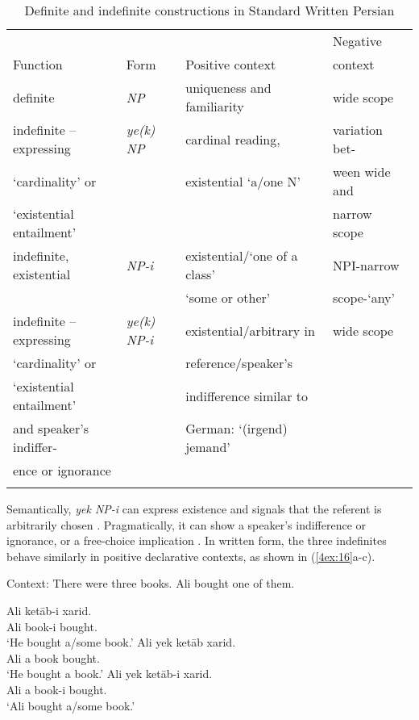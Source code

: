 \documentclass[output=paper]{langsci/langscibook}
\begin{document}
\begin{table}[H]
\centering
{\small{
\begin{tabular}{m{93pt}llm{65pt}}
\lsptoprule
 &  &  & Negative \\
Function & Form & Positive context & context \\
\midrule 
definite & {\emph{NP}} & uniqueness and familiarity & wide scope \\
\hline
indefinite -- expressing  	& {\emph{ye(k) NP}} 		& cardinal reading,  		& variation bet- \\
`cardinality' or  			& 					& existential `a/one N'	& ween wide and \\
`existential entailment'	&					&					& narrow scope \\
\hline
indefinite, existential 		& {\emph{NP-i}}		& existential/`one of a class' 	& NPI-narrow  \\
					&				& `some or other'			& scope-`any'\\
\hline 	
indefinite -- expressing 	& {\emph{ye(k) NP-i}}	& existential/arbitrary in 	& wide scope \\
`cardinality' or  			&					& reference/speaker’s	&  \\
`existential entailment'  	&					& indifference similar	 to	& \\
and speaker's indiffer-	&					& German: `(irgend) jemand'		& \\
ence or ignorance 		&					&					&  \\
\lspbottomrule
\end{tabular}
}}
\caption{{Definite and indefinite constructions in Standard Written Persian}}\label{4table:2}
\end{table}

{
Semantically, {\emph{yek NP-i}} can express existence and signals that the referent is arbitrarily chosen \citep{lyons:99}. Pragmatically, it can show a speaker's indifference or ignorance, or a free-choice implication \citep{jasbi:16}. In written form, the three indefinites behave similarly in positive declarative contexts, as shown in (\ref{4ex:16}a-c).
}

\begin{exe}
\ex\label{4ex:16}
Context: There were three books. Ali bought one of them.
	\begin{xlista}
	\ex\label{4ex:16a}
	\gll	Ali  	ketāb-i  	xarid. \\
		Ali  	book-i  	bought.{} \\
	\glt	`He bought a/some book.'
	\ex\label{4ex:16b}
        	\gll	Ali  	yek ketāb   	xarid. \\
		Ali   	a     book    	bought.{} \\
	\glt	`He bought a book.'
	\ex\label{4ex:16c}
        	\gll	Ali  	yek ketāb-i 	xarid. \\
		Ali  	a     book-i   	bought.{} \\
	\glt	`Ali bought a/some book.'
	\end{xlista}
\end{exe}
\end{document}
